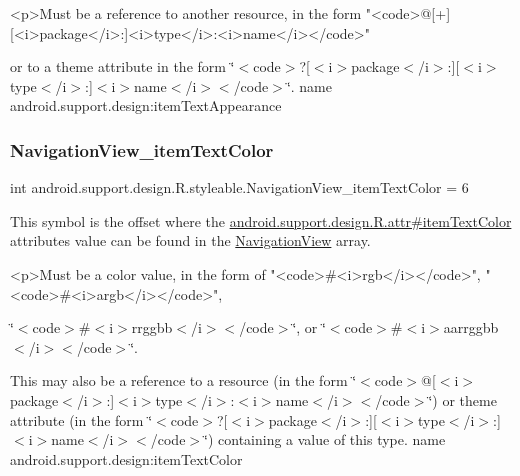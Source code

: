 \begin{DoxyVerb}      <p>Must be a reference to another resource, in the form "<code>@[+][<i>package</i>:]<i>type</i>:<i>name</i></code>"
\end{DoxyVerb}
 or to a theme attribute in the form \char`\"{}$<$code$>$?\mbox{[}$<$i$>$package$<$/i$>$\+:\mbox{]}\mbox{[}$<$i$>$type$<$/i$>$\+:\mbox{]}$<$i$>$name$<$/i$>$$<$/code$>$\char`\"{}.  name android.\+support.\+design\+:item\+Text\+Appearance \mbox{\label{classandroid_1_1support_1_1design_1_1R_1_1styleable_a038a1aa7295a7cfd8ef2e1ddac132fbf}} 
\subsubsection{\texorpdfstring{Navigation\+View\+\_\+item\+Text\+Color}{NavigationView\_itemTextColor}}
{\footnotesize\ttfamily int android.\+support.\+design.\+R.\+styleable.\+Navigation\+View\+\_\+item\+Text\+Color = 6\hspace{0.3cm}{\ttfamily [static]}}

This symbol is the offset where the \hyperlink{classandroid_1_1support_1_1design_1_1R_1_1attr_ae84392b543d3266d75d0a138ae68d544}{android.\+support.\+design.\+R.\+attr\#item\+Text\+Color} attribute\textquotesingle{}s value can be found in the \hyperlink{classandroid_1_1support_1_1design_1_1R_1_1styleable_a277c199f371e8804c26e2cd6dbf88999}{Navigation\+View} array.

\begin{DoxyVerb}      <p>Must be a color value, in the form of "<code>#<i>rgb</i></code>", "<code>#<i>argb</i></code>",
\end{DoxyVerb}
 \char`\"{}$<$code$>$\#$<$i$>$rrggbb$<$/i$>$$<$/code$>$\char`\"{}, or \char`\"{}$<$code$>$\#$<$i$>$aarrggbb$<$/i$>$$<$/code$>$\char`\"{}. 

This may also be a reference to a resource (in the form \char`\"{}$<$code$>$@\mbox{[}$<$i$>$package$<$/i$>$\+:\mbox{]}$<$i$>$type$<$/i$>$\+:$<$i$>$name$<$/i$>$$<$/code$>$\char`\"{}) or theme attribute (in the form \char`\"{}$<$code$>$?\mbox{[}$<$i$>$package$<$/i$>$\+:\mbox{]}\mbox{[}$<$i$>$type$<$/i$>$\+:\mbox{]}$<$i$>$name$<$/i$>$$<$/code$>$\char`\"{}) containing a value of this type.  name android.\+support.\+design\+:item\+Text\+Color \mbox{\label{classandroid_1_1support_1_1design_1_1R_1_1styleable_a6c5c625c53bededd9f38e33ea76de86a}} 
